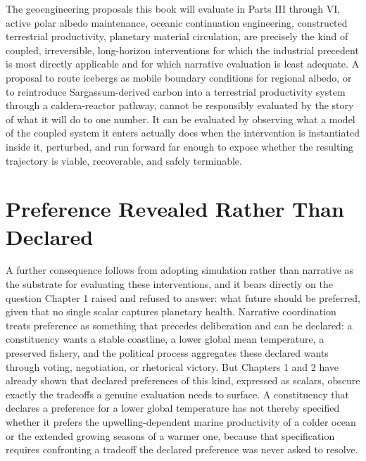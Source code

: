 \documentclass[11pt,oneside]{book}
\begin{document}
The geoengineering proposals this book will evaluate in Parts III through VI, active polar albedo maintenance, oceanic continuation engineering, constructed terrestrial productivity, planetary material circulation, are precisely the kind of coupled, irreversible, long-horizon interventions for which the industrial precedent is most directly applicable and for which narrative evaluation is least adequate. A proposal to route icebergs as mobile boundary conditions for regional albedo, or to reintroduce Sargassum-derived carbon into a terrestrial productivity system through a caldera-reactor pathway, cannot be responsibly evaluated by the story of what it will do to one number. It can be evaluated by observing what a model of the coupled system it enters actually does when the intervention is instantiated inside it, perturbed, and run forward far enough to expose whether the resulting trajectory is viable, recoverable, and safely terminable.

\section*{Preference Revealed Rather Than Declared}

A further consequence follows from adopting simulation rather than narrative as the substrate for evaluating these interventions, and it bears directly on the question Chapter 1 raised and refused to answer: what future should be preferred, given that no single scalar captures planetary health. Narrative coordination treats preference as something that precedes deliberation and can be declared: a constituency wants a stable coastline, a lower global mean temperature, a preserved fishery, and the political process aggregates these declared wants through voting, negotiation, or rhetorical victory. But Chapters 1 and 2 have already shown that declared preferences of this kind, expressed as scalars, obscure exactly the tradeoffs a genuine evaluation needs to surface. A constituency that declares a preference for a lower global temperature has not thereby specified whether it prefers the upwelling-dependent marine productivity of a colder ocean or the extended growing seasons of a warmer one, because that specification requires confronting a tradeoff the declared preference was never asked to resolve.
\end{document}
